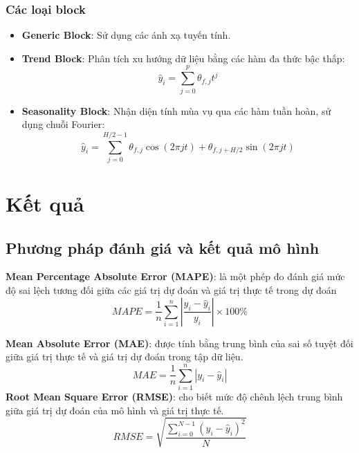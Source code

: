 \documentclass[conference]{IEEEtran}
\begin{document}
\subsubsection{Các loại block}
\begin{itemize}
    \item \textbf{Generic Block}: Sử dụng các ánh xạ tuyến tính.
    \item \textbf{Trend Block}: Phân tích xu hướng dữ liệu bằng các hàm đa thức bậc thấp:
          \[
              \hat{y}_i = \sum_{j=0}^{p} \theta_{f,j} t^j
          \]
    \item \textbf{Seasonality Block}: Nhận diện tính mùa vụ qua các hàm tuần hoàn, sử dụng chuỗi Fourier:
          \[
              \hat{y}_i = \sum_{j=0}^{H/2 - 1} \theta_{f,j} \cos(2\pi j t) + \theta_{f,j + H/2} \sin(2\pi j t)
          \]
\end{itemize}

\section{Kết quả}
\subsection{Phương pháp đánh giá và kết quả mô hình}
\textbf{Mean Percentage Absolute Error (MAPE)}: là một phép đo đánh giá mức độ sai lệch tương đối giữa các giá trị dự đoán và giá trị thực tế trong dự đoán
\[
    MAPE = \frac{1}{n} \sum_{i=1}^{n} \left| \frac{y_i - \hat{y}_i}{y_i} \right| \times 100\%
\]

\textbf{Mean Absolute Error (MAE)}: được tính bằng trung bình của sai số tuyệt đối giữa giá trị thực tế và giá trị dự đoán trong tập dữ liệu.
\[
    MAE = \frac{1}{n}\sum_{i=1}^{n}\left|y_i-{\hat{y}}_i\right|
\]
\textbf{Root Mean Square Error (RMSE)}: cho biết mức độ chênh lệch trung bình giữa giá trị dự đoán của mô hình và giá trị thực tế.
\[
    RMSE = \sqrt{\frac{\sum_{i=0}^{N - 1} (y_i - \hat{y}_i)^2}{N}}
\]
\end{document}
